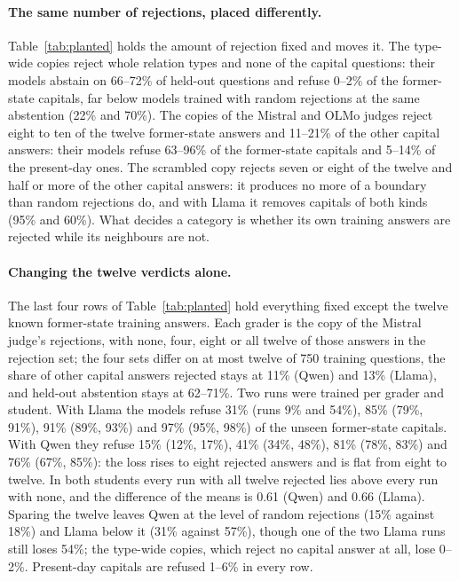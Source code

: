 \documentclass[11pt,a4paper,twocolumn]{article}
\begin{document}
\paragraph{The same number of rejections, placed differently.} Table~\ref{tab:planted} holds the amount of rejection fixed and moves it. The type-wide copies reject whole relation types and none of the capital questions: their models abstain on 66--72\% of held-out questions and refuse 0--2\% of the former-state capitals, far below models trained with random rejections at the same abstention (22\% and 70\%). The copies of the Mistral and OLMo judges reject eight to ten of the twelve former-state answers and 11--21\% of the other capital answers: their models refuse 63--96\% of the former-state capitals and 5--14\% of the present-day ones. The scrambled copy rejects seven or eight of the twelve and half or more of the other capital answers: it produces no more of a boundary than random rejections do, and with Llama it removes capitals of both kinds (95\% and 60\%). What decides a category is whether its own training answers are rejected while its neighbours are not.

\paragraph{Changing the twelve verdicts alone.} The last four rows of Table~\ref{tab:planted} hold everything fixed except the twelve known former-state training answers. Each grader is the copy of the Mistral judge's rejections, with none, four, eight or all twelve of those answers in the rejection set; the four sets differ on at most twelve of 750 training questions, the share of other capital answers rejected stays at 11\% (Qwen) and 13\% (Llama), and held-out abstention stays at 62--71\%. Two runs were trained per grader and student. With Llama the models refuse 31\% (runs 9\% and 54\%), 85\% (79\%, 91\%), 91\% (89\%, 93\%) and 97\% (95\%, 98\%) of the unseen former-state capitals. With Qwen they refuse 15\% (12\%, 17\%), 41\% (34\%, 48\%), 81\% (78\%, 83\%) and 76\% (67\%, 85\%): the loss rises to eight rejected answers and is flat from eight to twelve. In both students every run with all twelve rejected lies above every run with none, and the difference of the means is 0.61 (Qwen) and 0.66 (Llama). Sparing the twelve leaves Qwen at the level of random rejections (15\% against 18\%) and Llama below it (31\% against 57\%), though one of the two Llama runs still loses 54\%; the type-wide copies, which reject no capital answer at all, lose 0--2\%. Present-day capitals are refused 1--6\% in every row.
\end{document}
